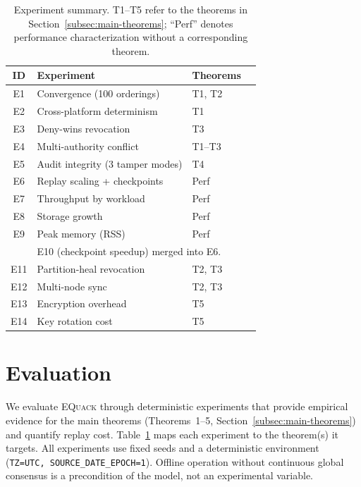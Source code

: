 \documentclass[10pt,journal,compsoc]{IEEEtran}
\newcommand{\equack}{\textsc{EQuack}}
\begin{document}
\begin{table}[!htbp]
\centering
\caption{Experiment summary. T1--T5 refer to the theorems in Section~\ref{subsec:main-theorems}; ``Perf'' denotes performance characterization without a corresponding theorem.}
\label{tab:experiment-summary}
\footnotesize
\setlength{\tabcolsep}{4pt}
\renewcommand{\arraystretch}{1.15}
\begin{tabular}{@{}clll@{}}
\toprule
\textbf{ID} & \textbf{Experiment} & \textbf{Theorems} \\
\midrule
E1  & Convergence (100 orderings)      & T1, T2  \\
E2  & Cross-platform determinism       & T1      \\
E3  & Deny-wins revocation             & T3      \\
E4  & Multi-authority conflict          & T1--T3   \\
E5  & Audit integrity (3 tamper modes)  & T4      \\
E6  & Replay scaling + checkpoints      & Perf    \\
E7  & Throughput by workload            & Perf    \\
E8  & Storage growth                    & Perf    \\
E9  & Peak memory (RSS)                 & Perf    \\
    & \multicolumn{2}{l}{\scriptsize E10 (checkpoint speedup) merged into E6.} \\
E11 & Partition-heal revocation         & T2, T3  \\
E12 & Multi-node sync                   & T2, T3  \\
E13 & Encryption overhead               & T5      \\
E14 & Key rotation cost                 & T5      \\
\bottomrule
\end{tabular}
\end{table}

\section{Evaluation}
\label{sec:evaluation}

We evaluate \equack{} through deterministic experiments that provide
empirical evidence for the main theorems (Theorems~1--5,
Section~\ref{subsec:main-theorems}) and quantify replay cost.
Table~\ref{tab:experiment-summary} maps each experiment to the
theorem(s) it targets. All experiments use fixed seeds and a
deterministic environment (\texttt{TZ=UTC, SOURCE\_DATE\_EPOCH=1}).
Offline operation without continuous global consensus is a
precondition of the model, not an experimental variable.
\end{document}
